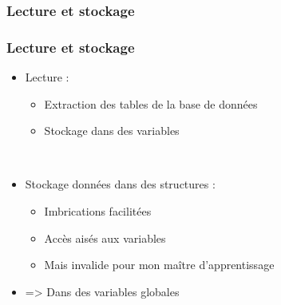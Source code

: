 \subsubsection{Lecture et stockage}

\begin{frame}
	\frametitle{Lecture et stockage}
	
	\begin{itemize}
		\item Lecture :
			\begin{itemize}
				\item Extraction des tables de la base de données
				\item Stockage dans des variables
			\end{itemize}~
			
		\item Stockage données dans des structures :
			\begin{itemize}
				\item Imbrications facilitées
				\item Accès aisés aux variables\sautligne
				
				\item Mais invalide pour mon maître d'apprentissage
			\end{itemize}
			
		\item => Dans des variables globales
	\end{itemize}
\end{frame}
